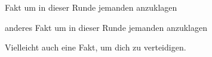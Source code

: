 \item Fakt um in dieser Runde jemanden anzuklagen

\item anderes Fakt um in dieser Runde jemanden anzuklagen
\item Vielleicht auch eine Fakt, um dich zu verteidigen.
